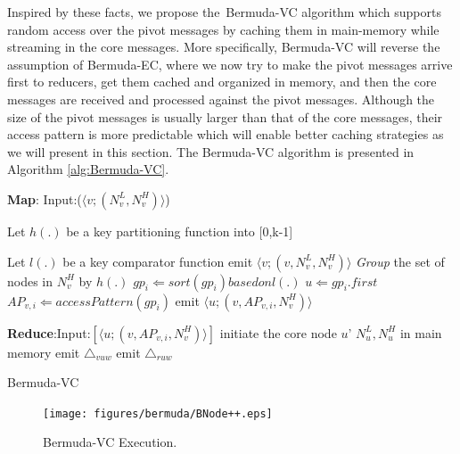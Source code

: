 Inspired by these facts, we propose the~Bermuda-VC algorithm which supports random access 
over the pivot messages by caching them in main-memory while streaming in the core messages. 
More specifically, Bermuda-VC will reverse the assumption of Bermuda-EC, where we now try to make the pivot messages arrive first to reducers, 
get them cached and organized in memory, and then the core messages are received and processed against the pivot messages. 
Although the size of the pivot messages is usually larger than that of the core messages,  
their access pattern is more predictable which will enable better caching strategies as we will present in this section. 
The Bermuda-VC algorithm is presented in Algorithm \ref{alg:Bermuda-VC}. 
\begin{algorithm}[t!]
	\begin{algorithmic}[1]
			\item[] \textbf{Map}: Input:($ \langle v;(N_v^L ,N_v^H) \rangle$) 
            \item[] {Let $h(.)$ be a key partitioning function into [0,k-1] }
            \item[] {Let $l(.)$ be a key comparator function}
			\STATE emit $\langle v;(v,N_v^L,N_v^H) \rangle$
			\STATE \emph{Group} the set of nodes in $N_v^H$ by $h(.)$
                	\STATE $gp_i \Leftarrow sort(gp_i) based on l(.)$
                    \STATE $u \Leftarrow gp_i.first$
					\STATE $AP_{v,i} \Leftarrow accessPattern(gp_i)$
					\STATE emit $\langle u;(v,AP_{v,i},N_v^H) \rangle$
				\ENDIF
			\ENDFOR
            \item[]
			\item[] \textbf{Reduce}:Input:$[\langle u;(v,AP_{v,i},N_v^H) \rangle]$ 
			\STATE initiate the core node $u$' $N_u^L,N_u^H$ in main memory
                	\STATE emit $\triangle_{vuw}$
                \ENDFOR
            \ENDFOR
                	\STATE emit $\triangle_{ruw}$
               	\ENDFOR
            \ENDFOR
	\end{algorithmic}
	\caption{Bermuda-VC}
	\label{alg:Bermuda-VC}
\end{algorithm}
\begin{figure}[t]
		\centering	
		\texttt{[image: figures/bermuda/BNode++.eps]}
		\caption {Bermuda-VC Execution.}
		\label{fig:Bermuda-VC}
\end{figure}

